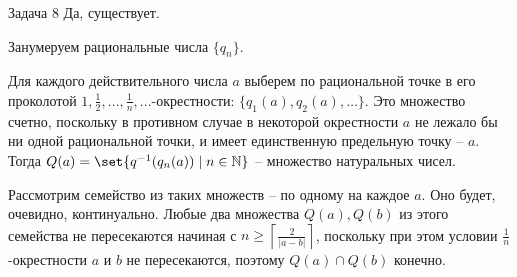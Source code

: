 \documentclass{article}
\newcommand{\abs}[1]{\left\lvert#1\right\rvert}
\newcommand{\ceil}[1]{\left\lceil#1\right\rceil}
\newcommand{\N}{\mathbb{N}}
\begin{document}
	\begin{section}{Задача 8}
		Да, существует.

		Занумеруем рациональные числа $\{q_n\}$.

		Для каждого действительного числа $a$ выберем по рациональной точке в его проколотой $1, \frac{1}{2}, \dots, \frac{1}{n}, \dots$-окрестности: $\{q_1(a), q_2(a), \dots\}$. Это множество счетно, поскольку в противном случае в некоторой окрестности $a$ не лежало бы ни одной рациональной точки, и имеет единственную предельную точку -- $a$. Тогда $Q(a) = \set{q^{-1}(q_n(a)) \mid n \in \N}$ -- множество натуральных чисел.

		Рассмотрим семейство из таких множеств -- по одному на каждое $a$. Оно будет, очевидно, континуально. Любые два множества $Q(a), Q(b)$ из этого семейства не пересекаются начиная с $n \ge \ceil{\frac{2}{\abs{a-b}}}$, поскольку при этом условии $\frac{1}{n}$-окрестности $a$ и $b$ не пересекаются, поэтому $Q(a) \cap Q(b)$ конечно.
	\end{section}
\end{document}
